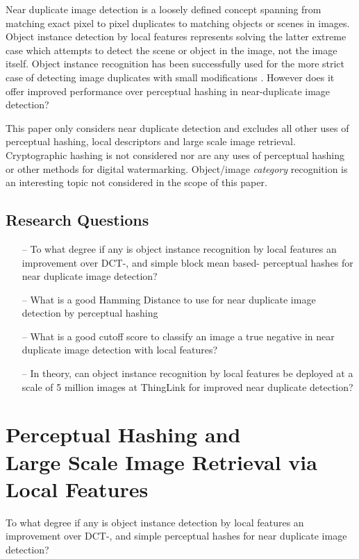 \documentclass[english,12pt,a4paper,pdftex,elec,utf8]{aaltothesis}
\begin{document}
Near duplicate image detection is a loosely defined concept spanning from matching exact pixel to pixel duplicates to matching objects or scenes in images. Object instance detection by local features represents solving the latter extreme case which attempts to detect the scene or object in the image, not the image itself. Object instance recognition has been successfully used for the more strict case of detecting image duplicates with small modifications \cite{dong2012high}. However does it offer improved performance over perceptual hashing in near-duplicate image detection?

This paper only considers near duplicate detection and excludes all other uses of perceptual hashing, local descriptors and large scale image retrieval. Cryptographic hashing is not considered nor are any uses of perceptual hashing or other methods for digital watermarking. Object/image \emph{category} recognition is an interesting topic not considered in the scope of this paper.

\subsection{Research Questions}
\begin{itemize}
\item[--] To what degree if any is object instance recognition by local features an improvement over DCT-, and simple block mean based- perceptual hashes for near duplicate image detection?
\item[--] What is a good Hamming Distance to use for near duplicate image detection by perceptual hashing
\item[--] What is a good cutoff score to classify an image a true negative in near duplicate image detection with local features?
\item[--] In theory, can object instance recognition by local features be deployed at a scale of 5 million images at ThingLink for improved near duplicate detection?

\end{itemize}

\clearpage

\section{Perceptual Hashing and \\Large Scale Image Retrieval via Local Features}
To what degree if any is object instance detection by local features an improvement over DCT-, and simple perceptual hashes for near duplicate image detection?
\end{document}
